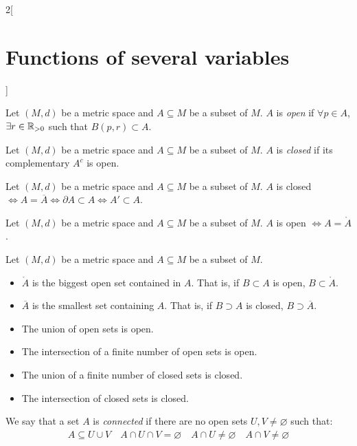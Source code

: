 \documentclass[../../../main.tex]{subfiles}
\begin{document}
\begin{multicols}{2}[\section{Functions of several variables}]
  \begin{definition}
    Let $(M,d)$ be a metric space and $A\subseteq M$ be a subset of $M$. $A$ is \textit{open} if $\forall p\in A$, $\exists r\in\mathbb{R}_{>0}$ such that $B(p,r)\subset A$.
  \end{definition}
  \begin{definition}
    Let $(M,d)$ be a metric space and $A\subseteq M$ be a subset of $M$. $A$ is \textit{closed} if its complementary $A^c$ is open.
  \end{definition}
  \begin{prop}
    Let $(M,d)$ be a metric space and $A\subseteq M$ be a subset of $M$. $A$ is closed $\iff A=\overline{A}\iff\partial A\subset A\iff A'\subset A$.
  \end{prop}
  \begin{prop}
    Let $(M,d)$ be a metric space and $A\subseteq M$ be a subset of $M$. $A$ is open $\iff A=\mathring A$.
  \end{prop}
  \begin{prop}
    Let $(M,d)$ be a metric space and $A\subseteq M$ be a subset of $M$.
    \begin{itemize}
      \item $\mathring A$ is the biggest open set contained in $A$. That is, if $B\subset A$ is open, $B\subset\mathring A$.
      \item $\overline{A}$ is the smallest set containing $A$. That is, if $B\supset A$ is closed, $B\supset\overline{A}$.
    \end{itemize}
  \end{prop}
  \begin{prop}
    \hfill
    \begin{itemize}
      \item The union of open sets is open.
      \item The intersection of a finite number of open sets is open.
      \item The union of a finite number of closed sets is closed.
      \item The intersection of closed sets is closed.
    \end{itemize}
  \end{prop}
  \begin{definition}
    We say that a set $A$ is \textit{connected} if there are no open sets $U,V\ne\varnothing$ such that:
    \begin{gather*}
      A\subseteq U\cup V\quad A\cap U\cap V=\varnothing\quad A\cap U\ne\varnothing\quad A\cap V\ne\varnothing
    \end{gather*}
  \end{definition}

\end{multicols}
\end{document}
